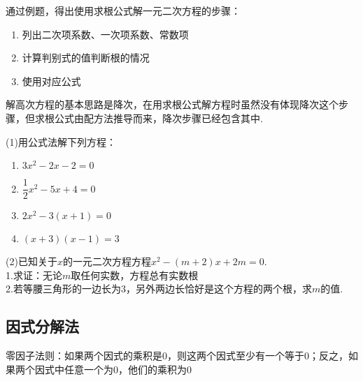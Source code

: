 通过例题，得出使用求根公式解一元二次方程的步骤：
\begin{enumerate}
    \item 列出二次项系数、一次项系数、常数项
    \item 计算判别式的值判断根的情况
    \item 使用对应公式
\end{enumerate}
\par
解高次方程的基本思路是降次，在用求根公式解方程时虽然没有体现降次这个步骤，但求根公式由配方法推导而来，降次步骤已经包含其中.
\begin{exercise}
\setlength{\parindent}{0pt} %
\setlength{\columnseprule}{0.01pt}
\begin{multicols}{2}
    (1)用公式法解下列方程：
    \begin{enumerate}
        \item \(3x^2-2x-2=0\)
        \item \(\dfrac{1}{2}x^2-5x+4=0\)
        \item \(2x^2-3(x+1)=0\)
        \item \((x+3)(x-1)=3\)
    \end{enumerate}
    (2)已知关于\(x\)的一元二次方程方程\(x^2-(m+2)x+2m=0\).\\
    1.求证：无论\(m\)取任何实数，方程总有实数根\\
    2.若等腰三角形的一边长为3，另外两边长恰好是这个方程的两个根，求\(m\)的值.
\end{multicols}
\end{exercise}

\subsection{因式分解法}

\begin{property}
    零因子法则：如果两个因式的乘积是0，则这两个因式至少有一个等于0；反之，如果两个因式中任意一个为0，他们的乘积为0
\end{property}

